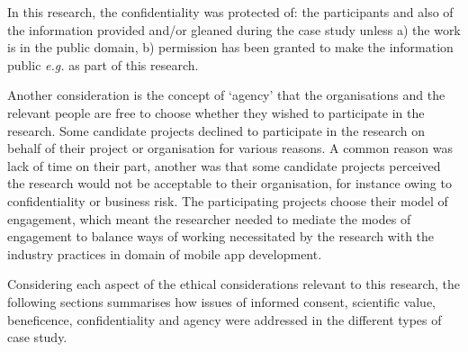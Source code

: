 



In this research, the confidentiality was protected of: the participants and also of the information provided and/or gleaned during the case study unless a) the work is in the public domain, b) permission has been granted to make the information public \textit{e.g.} as part of this research.

Another consideration is the concept of `agency' that the organisations and the relevant people are free to choose whether they wished to participate in the research. Some candidate projects declined to participate in the research on behalf of their project or organisation for various reasons. A common reason was lack of time on their part, another was that some candidate projects perceived the research would not be acceptable to their organisation, for instance owing to confidentiality or business risk. The participating projects choose their model of engagement, which meant the researcher needed to mediate the modes of engagement to balance ways of working necessitated by the research with the industry practices in domain of mobile app development. 

Considering each aspect of the ethical considerations relevant to this research, the following sections summarises how issues of informed consent, scientific value, beneficence, confidentiality and agency were addressed in the different types of case study.

